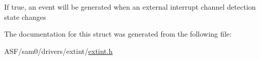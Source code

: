 If {\ttfamily true}, an event will be generated when an external interrupt channel detection state changes 

The documentation for this struct was generated from the following file\+:\begin{DoxyCompactItemize}
\item 
A\+S\+F/sam0/drivers/extint/\mbox{\hyperlink{extint_8h}{extint.\+h}}\end{DoxyCompactItemize}
